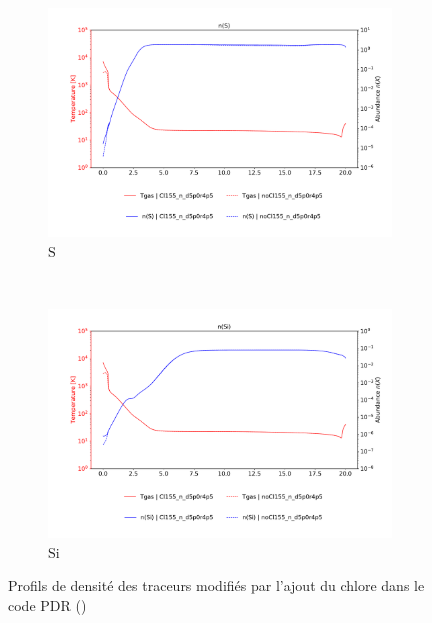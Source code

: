 \begin{figure}[!htbp]
    \begin{subfigure}[t]{0.45\textwidth} %
        \centering \includegraphics[trim = {0 0 0 1.5cm},clip,width=1\textwidth]{figure/Cl/gridModelEmiss/nT_comp_S.pdf}
        \caption{$\mathrm{S}$}
    \end{subfigure}
    ~
    \begin{subfigure}[t]{0.45\textwidth} %
        \centering \includegraphics[trim = {0 0 0 1.5cm},clip,width=1\textwidth]{figure/Cl/gridModelEmiss/nT_comp_Si.pdf}
        \caption{$\mathrm{Si}$}
    \end{subfigure}
    
    \caption{Profils de densité des traceurs modifiés par l'ajout du chlore dans le code PDR (\uncinq)}
    \label{fig:Cl:gridModelEmiss:nT:yes}
\end{figure}

